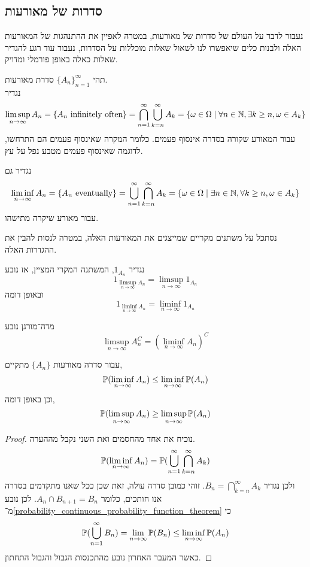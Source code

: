 \subsection{סדרות של מאורעות}
נעבור לדבר על העולם של סדרות של מאורעות, במטרה לאפיין את ההתנהגות של המאורעות האלה ולבנות כלים שיאפשרו לנו לשאול שאלות מוכללות על הסדרות, נעבור עוד רגע להגדיר שאלות כאלה באופן פורמלי ומדויק.
\begin{definition}
	תהי ${\{A_n\}}_{n = 1}^\infty$ סדרת מאורעות. \\
	נגדיר
	\[
		\limsup_{n \to \infty} A_n = \{ A_n \text{ infinitely often} \} = \bigcap_{n = 1}^\infty \bigcup_{k = n}^\infty A_k
		= \{ \omega \in \Omega \mid \forall n \in \mathbb{N}, \exists k \ge n, \omega \in A_k \}
	\]
	עבור המאורע שקורה בסדרה אינסוף פעמים.
	כלומר המקרה שאינסוף פעמים הם התרחשו, לדוגמה שאינסוף פעמים מטבע נפל על עץ.

	נגדיר גם
	\[
		\liminf_{n \to \infty} A_n
		= \{ A_n \text{ eventually} \}
		= \bigcup_{n = 1}^\infty \bigcap_{k = n}^\infty A_k
		= \{ \omega \in \Omega \mid \exists n \in \mathbb{N}, \forall k \ge n, \omega \in A_k \}
	\]
	עבור מאורע שיקרה מתישהו.
\end{definition}
נסתכל על משתנים מקריים שמייצגים את המאורעות האלה, במטרה לנסות להבין את ההגדרות האלה.
\begin{exercise}
	נגדיר $1_{A_n}$, המשתנה המקרי המציין, אז נובע
	\[
		1_{\limsup_{n \to \infty} A_n}
		= \limsup_{n \to \infty} 1_{A_n}
	\]
	ובאופן דומה
	\[
		1_{\liminf_{n \to \infty} A_n}
		= \liminf_{n \to \infty} 1_{A_n}
	\]
\end{exercise}
\begin{remark}
	מדה־מורגן נובע
	\[
		\limsup_{n \to \infty} A_n^C
		= {(\liminf_{n \to \infty} A_n)}^C
	\]
\end{remark}

\begin{lemma}
	עבור סדרה מאורעות $\{ A_n \}$ מתקיים,
	\[
		\mathbb{P}(\liminf_{n \to \infty} A_n)
		\le 
		\liminf_{n \to \infty} \mathbb{P}(A_n)
	\]
	וכן באופן דומה,
	\[
		\mathbb{P}(\limsup_{n \to \infty} A_n)
		\ge 
		\limsup_{n \to \infty} \mathbb{P}(A_n)
	\]
\end{lemma}
\begin{proof}
	נוכיח את אחד מהחסמים ואת השני נקבל מההערה.
	\[
		\mathbb{P}(\liminf_{n \to \infty} A_n)
		= \mathbb{P}( \bigcup_{n = 1}^\infty \bigcap_{k = n}^\infty A_k)
	\]
	ולכן נגדיר $B_n = \bigcap_{k = n}^\infty A_k$.
	זוהי כמובן סדרה עולה, זאת שכן ככל שאנו מתקדמים בסדרה אנו חותכים, כלומר $A_n \cap B_{n + 1} = B_n$.
	לכן נובע מ־\ref{probability_continuous_probability_function_theorem} כי
	\[
		\mathbb{P}(\bigcup_{n = 1}^\infty B_n)
		= \lim_{n \to \infty} \mathbb{P}(B_n)
		\le \liminf_{n \to \infty} \mathbb{P}(A_n)
	\]
	כאשר המעבר האחרון נובע מהתכנסות הגבול והגבול התחתון.
\end{proof}

